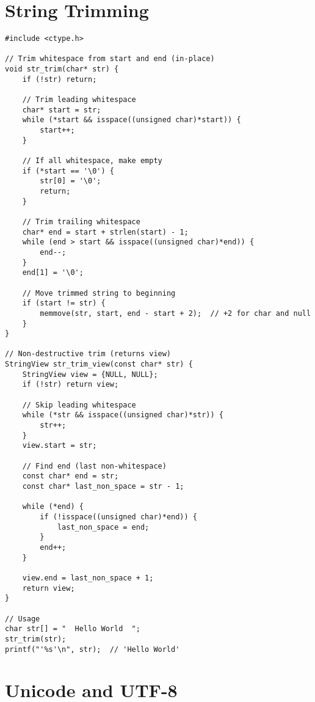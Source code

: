 \section{String Trimming}

\begin{lstlisting}
#include <ctype.h>

// Trim whitespace from start and end (in-place)
void str_trim(char* str) {
    if (!str) return;

    // Trim leading whitespace
    char* start = str;
    while (*start && isspace((unsigned char)*start)) {
        start++;
    }

    // If all whitespace, make empty
    if (*start == '\0') {
        str[0] = '\0';
        return;
    }

    // Trim trailing whitespace
    char* end = start + strlen(start) - 1;
    while (end > start && isspace((unsigned char)*end)) {
        end--;
    }
    end[1] = '\0';

    // Move trimmed string to beginning
    if (start != str) {
        memmove(str, start, end - start + 2);  // +2 for char and null
    }
}

// Non-destructive trim (returns view)
StringView str_trim_view(const char* str) {
    StringView view = {NULL, NULL};
    if (!str) return view;

    // Skip leading whitespace
    while (*str && isspace((unsigned char)*str)) {
        str++;
    }
    view.start = str;

    // Find end (last non-whitespace)
    const char* end = str;
    const char* last_non_space = str - 1;

    while (*end) {
        if (!isspace((unsigned char)*end)) {
            last_non_space = end;
        }
        end++;
    }

    view.end = last_non_space + 1;
    return view;
}

// Usage
char str[] = "  Hello World  ";
str_trim(str);
printf("'%s'\n", str);  // 'Hello World'
\end{lstlisting}

\section{Unicode and UTF-8}

